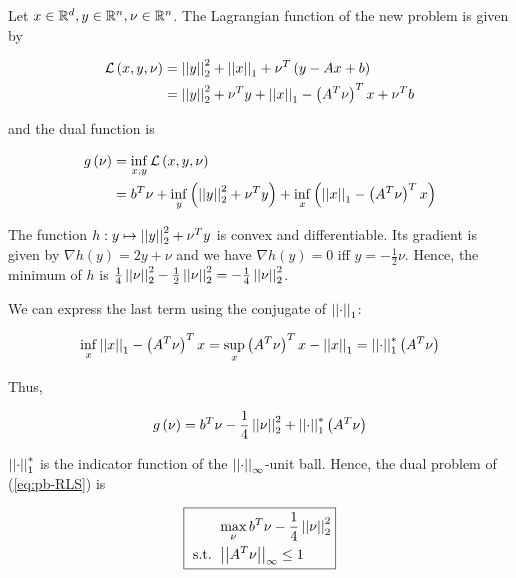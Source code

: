 \documentclass[a4paper, 11pt]{report}
\begin{document}
\begin{enumerate}
    Let $x \in \mathbb{R}^{d}, y \in \mathbb{R}^{n}, \nu \in \mathbb{R}^{n}$. The Lagrangian function of the new problem is given by
    
    \begin{equation*}
        \begin{aligned}
        \mathcal{L} \left( x, y, \nu \right) &= \left|\left| y \right|\right|_{2}^{2} + \left|\left| x \right|\right|_{1} + \nu^{T} \left( y - Ax + b \right) \\
        &= \left|\left| y \right|\right|_{2}^{2} + \nu^{T} y + \left|\left| x \right|\right|_{1} - \left( A^{T} \nu \right)^{T} x + \nu^{T} b
        \end{aligned}
    \end{equation*}
    
    and the dual function is
    
        \begin{equation*}
        \begin{aligned}
        g \left( \nu \right) &= \inf_{x, y} \mathcal{L} \left( x, y, \nu \right) \\
        &= b^{T} \nu + \inf_{y} \left( \left|\left| y \right|\right|_{2}^{2} + \nu^{T} y \right) + \inf_{x} \left( \left|\left| x \right|\right|_{1} - \left( A^{T} \nu \right)^{T} x \right)
        \end{aligned}
    \end{equation*}
    
    The function $h: y \mapsto \left|\left| y \right|\right|_{2}^{2} + \nu^{T} y$ is convex and differentiable. Its gradient is given by $\nabla h (y) = 2y + \nu$ and we have $\nabla h(y) = 0$ iff $y = - \frac{1}{2} \nu$. Hence, the minimum of $h$ is $\frac{1}{4} \left|\left| \nu \right|\right|_{2}^{2} - \frac{1}{2} \left|\left| \nu \right|\right|_{2}^{2} = - \frac{1}{4} \left|\left| \nu \right|\right|_{2}^{2}$.
    
    We can express the last term using the conjugate of $\left|\left| \cdot \right|\right|_{1}$:
    
    \[ \inf_{x} \left|\left| x \right|\right|_{1} - \left( A^{T} \nu \right)^{T} x = \sup_{x} \left( A^{T} \nu \right)^{T} x - \left|\left| x \right|\right|_{1} = \left|\left| \cdot \right|\right|_{1}^{*} \left( A^{T} \nu \right) \]
    
    Thus,
    
    \[ g \left( \nu \right) = b^{T} \nu - \frac{1}{4} \left|\left| \nu \right|\right|_{2}^{2} + \left|\left| \cdot \right|\right|_{1}^{*} \left( A^{T} \nu \right) \]
    
    $\left|\left| \cdot \right|\right|_{1}^{*}$ is the indicator function of the $\left|\left| \cdot \right|\right|_{\infty}$-unit ball. Hence, the dual problem of (\ref{eq:pb-RLS}) is
    
    \begin{equation*}
        \boxed{\begin{aligned}
        & \max_{\nu} b^{T} \nu - \frac{1}{4} \left|\left| \nu \right|\right|_{2}^{2} \\
        \text{ s.t. } & \left|\left| A^{T} \nu \right|\right|_{\infty} \leq 1
        \end{aligned}}
    \end{equation*}
\end{enumerate}
\end{document}
